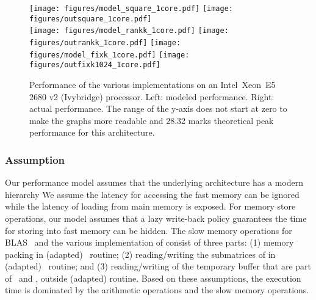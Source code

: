 \begin{figure*}[htp!]
	\centering
	\texttt{[image: figures/model\_square\_1core.pdf]}
    \texttt{[image: figures/outsquare\_1core.pdf]}\\
    \texttt{[image: figures/model\_rankk\_1core.pdf]}
    \texttt{[image: figures/outrankk\_1core.pdf]}
    \texttt{[image: figures/model\_fixk\_1core.pdf]}
    \texttt{[image: figures/outfixk1024\_1core.pdf]}
\caption{Performance of the various implementations on an Intel\textregistered\ Xeon\textregistered\ E5 2680 v2 (Ivybridge) processor.
		Left: modeled performance. Right: actual performance.
		The range of the y-axis does not start at zero to make the graphs more readable and 28.32 marks theoretical peak performance for this architecture.
	}
	\label{fig:model}
\end{figure*} 

\subsubsection*{Assumption}
Our performance model assumes that the underlying architecture has a modern  hierarchy 
We assume the latency for accessing the fast memory can be ignored  while the latency of loading from main memory is exposed.
For memory store operations, our model assumes that a lazy write-back policy guarantees the time for storing
into fast memory can be hidden.
The slow memory operations for BLAS \dgemm\ and the various implementation of \strassen{} consist of three
parts: (1) memory packing in (adapted) \dgemm\ routine; (2) reading/writing the submatrices of  in (adapted) \dgemm\ routine; and (3) reading/writing of
the temporary buffer that are part of  \XXXstrassen\ and \ABXstrassen, outside (adapted) \dgemm{} routine.
Based on these assumptions, the execution time is dominated by the arithmetic operations and the slow memory operations.

